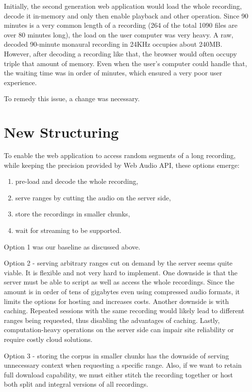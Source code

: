 \documentclass[conference]{IEEEtran}
\begin{document}
Initially, the second generation web application would load the whole recording,
decode it in-memory and only then enable playback and other operation. Since 90
minutes is a very common length of a recording (264 of the total 1090 files are
over 80 minutes long), the load on the user computer was very heavy. A raw,
decoded 90-minute monaural recording in 24KHz occupies about 240MB. However,
after decoding a recording like that, the browser would often occupy triple that
amount of memory. Even when the user's computer could handle that, the waiting
time was in order of minutes, which ensured a very poor user experience.

To remedy this issue, a change was necessary.

\section{New Structuring}

To enable the web application to access random segments of a long recording, while keeping the precision provided by Web Audio API, these options emerge: 
\begin{enumerate}
    \item{pre-load and decode the whole recording,}
    \item{serve ranges by cutting the audio on the server side,}
    \item{store the recordings in smaller chunks,}
    \item{wait for streaming to be supported.}
\end{enumerate}

Option 1 was our baseline as discussed above.

Option 2 - serving arbitrary ranges cut on demand by the server seems quite
viable. It is flexible and not very hard to implement. One downside is that the
server must be able to script as well as access the whole recordings. Since the
amount is in order of tens of gigabytes even using compressed audio formats, it
limits the options for hosting and increases costs. Another downside is with
caching. Repeated sessions with the same recording would likely lead to
different ranges being requested, thus disabling the advantages of caching.
Lastly, computation-heavy operations on the server side can impair site
reliability or require costly cloud solutions.

Option 3 - storing the corpus in smaller chunks has the downside of serving
unnecessary context when requesting a specific range. Also, if we want to retain
full download capability, we must either stitch the recording together or host
both split and integral versions of all recordings.
\end{document}

